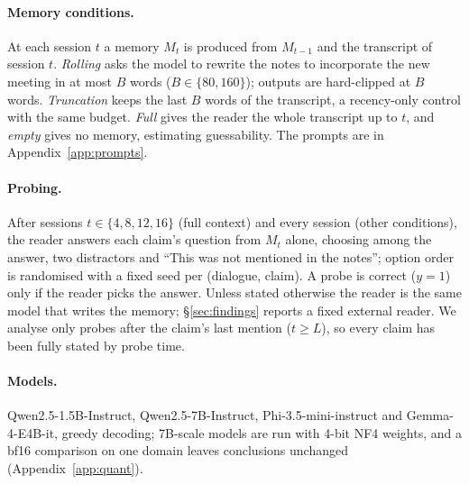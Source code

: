 \paragraph{Memory conditions.}
At each session $t$ a memory $M_t$ is produced from $M_{t-1}$ and the transcript of session $t$.
\emph{Rolling} asks the model to rewrite the notes to incorporate the new meeting in at most $B$ words ($B\in\{80,160\}$); outputs are hard-clipped at $B$ words.
\emph{Truncation} keeps the last $B$ words of the transcript, a recency-only control with the same budget.
\emph{Full} gives the reader the whole transcript up to $t$, and \emph{empty} gives no memory, estimating guessability.
The prompts are in Appendix~\ref{app:prompts}.

\paragraph{Probing.}
After sessions $t\in\{4,8,12,16\}$ (full context) and every session (other conditions), the reader answers each claim's question from $M_t$ alone, choosing among the answer, two distractors and ``This was not mentioned in the notes''; option order is randomised with a fixed seed per (dialogue, claim).
A probe is correct ($y=1$) only if the reader picks the answer.
Unless stated otherwise the reader is the same model that writes the memory; \S\ref{sec:findings} reports a fixed external reader.
We analyse only probes after the claim's last mention ($t\ge L$), so every claim has been fully stated by probe time.

\paragraph{Models.}
Qwen2.5-1.5B-Instruct, Qwen2.5-7B-Instruct, Phi-3.5-mini-instruct and Gemma-4-E4B-it, greedy decoding; 7B-scale models are run with 4-bit NF4 weights, and a bf16 comparison on one domain leaves conclusions unchanged (Appendix~\ref{app:quant}).
